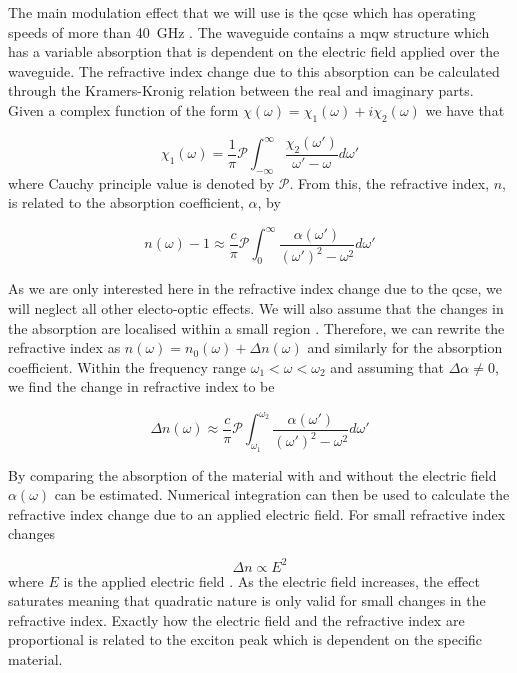 The main modulation effect that we will use is the \ac{qcse} which has operating speeds of more than \SI{40}{GHz} \cite{qcse, smit2014}. The waveguide contains a \ac{mqw} structure which has a variable absorption that is dependent on the electric field applied over the waveguide. The refractive index change due to this absorption can be calculated through the Kramers-Kronig relation between the real and imaginary parts. Given a complex function of the form $\chi(\omega) = \chi_1(\omega) + i \chi_2(\omega)$ we have that

\begin{equation}
	\chi_1(\omega) = \frac{1}{\pi} \mathcal{P} \int_{-\infty}^{\infty} \frac{\chi_2(\omega')}{\omega' - \omega} d\omega'
\end{equation}
where Cauchy principle value is denoted by $\mathcal{P}$. From this, the refractive index, $n$, is related to the absorption coefficient, $\alpha$, by \cite{Hutchings1992}

\begin{equation}
	n(\omega) - 1 \approx \frac{c}{\pi}\mathcal{P}\int_0^\infty \frac{\alpha(\omega')}{(\omega')^2 - \omega^2} d\omega'
\end{equation}

As we are only interested here in the refractive index change due to the \ac{qcse}, we will neglect all other electo-optic effects. We will also assume that the changes in the absorption are localised within a small region \cite{weiner1987}. Therefore, we can rewrite the refractive index as $n(\omega) = n_0(\omega) + \Delta n (\omega)$ and similarly for the absorption coefficient. Within the frequency range $\omega_1 < \omega < \omega_2$ and assuming that $\Delta \alpha \ne 0$, we find the change in refractive index to be

\begin{equation}
	\Delta n(\omega) \approx \frac{c}{\pi}\mathcal{P}\int_{\omega_1}^{\omega_2} \frac{\alpha(\omega')}{(\omega')^2 - \omega^2} d\omega'
\end{equation}

By comparing the absorption of the material with and without the electric field $\alpha(\omega)$ can be estimated. Numerical integration can then be used to calculate the refractive index change due to an applied electric field. For small refractive index changes

\begin{equation}
	\Delta n \propto E^2
\end{equation}
where $E$ is the applied electric field \cite{qcse}. As the electric field increases, the effect saturates meaning that quadratic nature is only valid for small changes in the refractive index. Exactly how the electric field and the refractive index are proportional is related to the exciton peak which is dependent on the specific material. 

